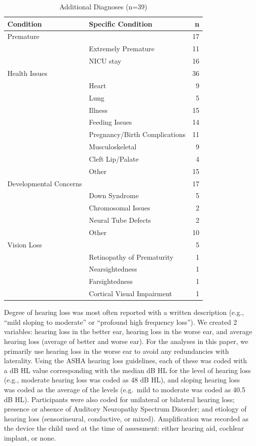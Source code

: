 \documentclass[english,man]{apa6}
\begin{document}
\begin{longtable}[t]{l|l|r}
\caption{\label{tab:comorbid-info}Additional Diagnoses (n=39)}\\
\hline
Condition & Specific Condition & n\\
\hline
Premature &  & 17\\
\hline
 & Extremely Premature & 11\\
\hline
 & NICU stay & 16\\
\hline
Health Issues &  & 36\\
\hline
 & Heart & 9\\
\hline
 & Lung & 5\\
\hline
 & Illness & 15\\
\hline
 & Feeding Issues & 14\\
\hline
 & Pregnancy/Birth Complications & 11\\
\hline
 & Musculoskeletal & 9\\
\hline
 & Cleft Lip/Palate & 4\\
\hline
 & Other & 15\\
\hline
Developmental Concerns &  & 17\\
\hline
 & Down Syndrome & 5\\
\hline
 & Chromosomal Issues & 2\\
\hline
 & Neural Tube Defects & 2\\
\hline
 & Other & 10\\
\hline
Vision Loss &  & 5\\
\hline
 & Retinopathy of Prematurity & 1\\
\hline
 & Nearsightedness & 1\\
\hline
 & Farsightedness & 1\\
\hline
 & Cortical Visual Impairment & 1\\
\hline
\end{longtable}

Degree of hearing loss was most often reported with a written description (e.g., \enquote{mild sloping to moderate} or \enquote{profound high frequency loss}). We created 2 variables: hearing loss in the better ear, hearing loss in the worse ear, and average hearing loss (average of better and worse ear). For the analyses in this paper, we primarily use hearing loss in the worse ear to avoid any redundancies with laterality. Using the ASHA hearing loss guidelines, each of these was coded with a dB HL value corresponding with the median dB HL for the level of hearing loss (e.g., moderate hearing loss was coded as 48 dB HL), and sloping hearing loss was coded as the average of the levels (e.g.~mild to moderate was coded as 40.5 dB HL). Participants were also coded for unilateral or bilateral hearing loss; presence or absence of Auditory Neuropathy Spectrum Disorder; and etiology of hearing loss (sensorineural, conductive, or mixed). Amplification was recorded as the device the child used at the time of assessment: either hearing aid, cochlear implant, or none.
\end{document}
